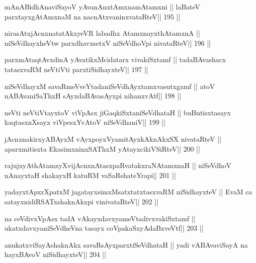 \begin{shl}
mAnABidhAnaviSayoV yAvanAnx\s\s tAmxnamAtamxni ||
laBateV parxtayxgAtAmxnaM na nacnAtxvaninxvataRteV\hfill || 195 ||
\end{shl}

\begin{shl}
nirasAtxjAcnxnatatAkxyeVR labadhx AtamxnayxthA\s\s tamxnA ||
niSeVdhayxheVtw parxdhavxsetxV niSeVdhoV\s pi nivataRteV\hfill || 196 ||
\end{shl}

\begin{shl}
parxmAtaqtAvxdinA yAvatikxMcidatarx vivakiSxtamf ||
tadaBAvashacx tatasxvaRM neVtiVti parxtiSidhayxteV\hfill || 197 ||
\end{shl}

\begin{shl}
niSeVdhayxM savaRmeVveYtadaniSeVdhAyxtamxvasutxgamf ||
atoV nABAvaniSaThxH sAyxdaBAvasAyxpi nihanxvAtf\hfill || 198 ||
\end{shl}

\begin{shl}
neVti neVtiVtayxtoV viVpAsx jiGaqkiSxtaniSeVdhataH ||
buButisxtasayx kaqtasxnXsayx viVpesxYvAtoV niSeVdhaniV\hfill || 199 ||
\end{shl}

\begin{shl}
jAcnxnakirxyABAyxM vAyxpoyxV\s yamitAyxkAknAkxSX nivataRteV ||
aparxmitisxta EkasimxninxSAThxM yAtayxcikiVSiRteV\hfill || 200 ||
\end{shl}

\begin{shl}
rajujxyAthAtamxyXvijAcnxnAtasxpaRvatakxraNAtamxnaH ||
niSeVdhoV nAnayxtaH shakayxH katuRM vaSaRshateYrapi\hfill || 201  ||
\end{shl}

\begin{shl}
yadayxtApxrXpatxM jagatayxsimxMsatxtatxtasxvaRM niSidhayxteV ||
EvaM ca satayxnidiRSATxshaknAkx\s pi vinivataRteV\hfill || 202 ||
\end{shl}

\begin{shl}
na ceVdivxVpAsx tadA vAkayxdavxyameVtadivxvakiSxtamf ||
ukatxdavxyaniSeVdheVna tasayx coVpakaSxyAdaBxveVtf\hfill || 203 ||
\end{shl}

\begin{shl}
anukatxviSayAshaknAkx savaRsAyxparxtiSeVdhataH ||
yadi vA\s BAvaviSayA na hayxBAvoV niSidhayxteV\hfill || 204 ||
\end{shl}

